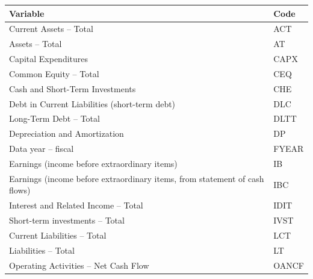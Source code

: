 {\renewcommand{\arraystretch}{1.5}

\begin{table}[htb!]
\centering
\begin{tabular}{|l|l|}
\hline
\textbf{Variable}                                                          & \textbf{Code} \\ \hline
Current Assets – Total                                                     & ACT           \\ \hline
Assets – Total                                                             & AT            \\ \hline
Capital Expenditures                                                       & CAPX          \\ \hline
Common Equity – Total                                                      & CEQ           \\ \hline
Cash and Short-Term Investments                                            & CHE           \\ \hline
Debt in Current Liabilities (short-term debt)                              & DLC           \\ \hline
Long-Term Debt – Total                                                     & DLTT          \\ \hline
Depreciation and Amortization                                              & DP            \\ \hline
Data year – fiscal                                                         & FYEAR         \\ \hline
Earnings (income before extraordinary items)                               & IB            \\ \hline
Earnings (income before extraordinary items, from statement of cash flows) & IBC           \\ \hline
Interest and Related Income – Total                                        & IDIT          \\ \hline
Short-term investments – Total                                             & IVST          \\ \hline
Current Liabilities – Total                                                & LCT           \\ \hline
Liabilities – Total                                                        & LT            \\ \hline
Operating Activities – Net Cash Flow                                       & OANCF         \\ \hline

\end{tabular}
\end{table}}
